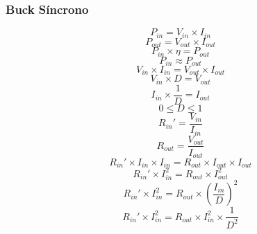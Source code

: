 \subsubsection{Buck Síncrono}
\begin{equation} \label{potin}
	P_{in} = {V_{in} \times  I_{in}}
	\end{equation}
\begin{equation} \label{potout}
	 P_{out} = {V_{out} \times  I_{out}} 
\end{equation}
\begin{equation} \label{potineqpotout}
	 P_{in}\times\eta = P_{out}
\end{equation}
\begin{equation} \label{potinaproxpotout}
	 P_{in}\approx P_{out}
\end{equation}
\begin{equation} \label{voutvioniiniout}
	 {V_{in} \times  I_{in}} = {V_{out} \times  I_{out}} 
\end{equation}
\begin{equation} \label{vinDvout}
	 {V_{in} \times  D} = {V_{out} } 
\end{equation}
\begin{equation} \label{iinioutd}
	{ I_{in} \times \frac{1}{D}} = {I_{out}} 
\end{equation}
\begin{equation} \label{limitesded}
	{0\leq D \leq 1}
\end{equation}
\begin{equation} \label{rinprima}
	{ R_{in}'} = {\frac{V_{in}}{I_{in}}} 
\end{equation}
\begin{equation} \label{routprima}
	{ R_{out}} = {\frac{V_{out}}{I_{out}}} 
\end{equation}
\begin{equation} \label{rinandrouteq}
	{ R_{in}'\times I_{in} \times I_{in}} = {R_{out}\times I_{out} \times I_{out}} 
\end{equation}
\begin{equation} \label{rinroutsquare}
	{ R_{in}'\times I_{in}^2} = {R_{out}\times I_{out}^2} 
\end{equation}
\begin{equation} \label{rinroutsquareoniinonesquare}
	{ R_{in}'\times I_{in}^2} = {R_{out}\times (\frac{I_{in}}{D})^2} 
\end{equation}
\begin{equation} \label{rinroutsquareoniin}
	{ R_{in}'\times I_{in}^2} = {R_{out}\times I_{in}^2 \times \frac{1}{D^2}} 
\end{equation}
